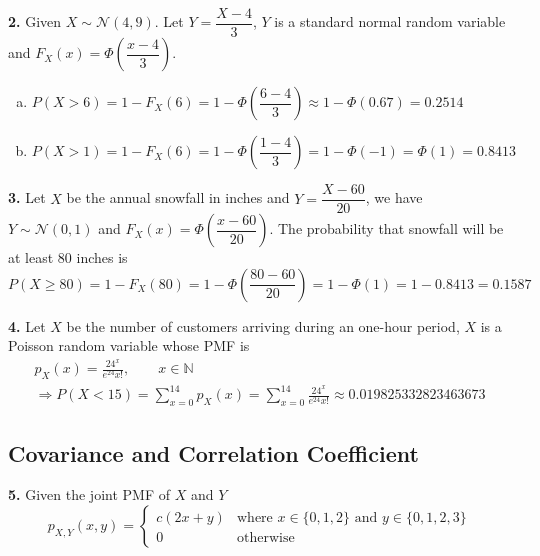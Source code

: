 \documentclass[a4paper,12pt]{article}
\newcommand{\N}{\mathcal N}
\newcommand{\exercise}[1]{\noindent\textbf{#1.}}
\begin{document}
\exercise 2  Given $X \sim \N(4, 9)$.  Let $Y = \dfrac{X - 4}{3}$,
$Y$ is a standard normal random variable
and $F_X(x) = \Phi\left(\dfrac{x - 4}{3}\right)$.
\begin{enumerate}[(a)]
  \item $P(X > 6) = 1 - F_X(6) = 1 - \Phi\left(\dfrac{6 - 4}{3}\right)
    \approx 1 - \Phi(0.67) = 0.2514$
  \item $P(X > 1) = 1 - F_X(6) = 1 - \Phi\left(\dfrac{1 - 4}{3}\right)
    = 1 - \Phi(-1) =  \Phi(1) = 0.8413$
\end{enumerate}

\exercise 3  Let $X$ be the annual snowfall in inches
and $Y = \dfrac{X - 60}{20}$, we have $Y \sim \N(0, 1)$
and $F_X(x) = \Phi\left(\dfrac{x - 60}{20}\right)$.
The probability that snowfall will be at least 80 inches is
\[P(X \ge 80) = 1 - F_X(80) = 1 - \Phi\left(\frac{80 - 60}{20}\right)
= 1 - \Phi(1) = 1 - 0.8413 = 0.1587\]

\exercise 4  Let $X$ be the number of customers arriving during an one-hour
period, $X$ is a Poisson random variable whose PMF is
\begin{multline*}
  p_X(x) = \frac{24^x}{e^{24}x!},\qquad x \in \mathbb N\\
  \Longrightarrow P(X < 15) = \sum_{x=0}^{14}p_X(x)
  = \sum_{x=0}^{14}\frac{24^x}{e^{24}x!} \approx 0.019825332823463673
\end{multline*}

\subsection{Covariance and Correlation Coefficient}
\exercise 5  Given the joint PMF of $X$ and $Y$
\[p_{X,Y}(x, y) = \begin{cases}
  c(2x + y) &\text{where }x \in \{0, 1, 2\}\text{ and }y \in \{0, 1, 2, 3\}\\
  0 &\text{otherwise}
\end{cases}\]
\end{document}
